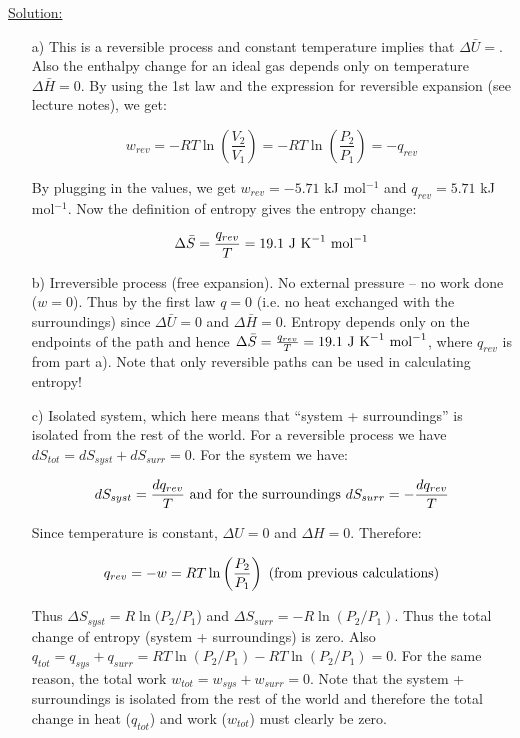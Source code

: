 \noindent
\underline{Solution:}\\

\begin{itemize}

\item[a)] This is a reversible process and constant temperature implies that $\Delta\bar{U} = $. Also the enthalpy change for an ideal gas depends only on temperature $\Delta\bar{H} = 0$. By using the 1st law and the expression for reversible expansion (see lecture notes), we get:

$$w_{rev} = -RT\ln\left(\frac{V_2}{V_1}\right) = -RT\ln\left(\frac{P_2}{P_1}\right) = - q_{rev}$$

By plugging in the values, we get $w_{rev} = -5.71$ kJ mol$^{-1}$ and $q_{rev} = 5.71$ kJ mol$^{-1}$. Now the definition of entropy gives the entropy change:

$$\Delta\bar{S} = \frac{q_{rev}}{T} = 19.1\textnormal{ J K}^{-1}\textnormal{ mol}^{-1}$$

\item[b)] Irreversible process (free expansion). No external pressure -- no work done ($w = 0$). Thus by the first law $q = 0$ (i.e. no heat exchanged with the surroundings) since $\Delta\bar{U} = 0$ and $\Delta\bar{H} = 0$. Entropy depends only on the endpoints of the path and hence $\Delta\bar{S} = \frac{q_{rev}}{T} = 19.1\textnormal{ J K}^{-1}\textnormal{ mol}^{-1}$, where $q_{rev}$ is from part a). Note that only reversible paths can be used in calculating entropy!

\item[c)] Isolated system, which here means that ``system + surroundings'' is isolated from the rest of the world. For a reversible process we have $dS_{tot} = dS_{syst} + dS_{surr} = 0$. For the system we have:

$$dS_{syst} = \frac{dq_{rev}}{T}\textnormal{ and for the surroundings }dS_{surr} = -\frac{dq_{rev}}{T}$$

Since temperature is constant, $\Delta U = 0$ and $\Delta H = 0$. Therefore:

$$q_{rev} = -w = RT\ln\left(\frac{P_2}{P_1}\right)\textnormal{ (from previous calculations)}$$

Thus $\Delta S_{syst} = R\ln(P_2/P_1$) and $\Delta S_{surr}  = -R\ln(P_2/P_1)$. Thus the total change of entropy (system + surroundings) is zero. Also $q_{tot} = q_{sys} + q_{surr} = RT\ln(P_2/P_1) - RT\ln(P_2/P_1) = 0$. For the same reason, the total work $w_{tot} = w_{sys} + w_{surr} = 0$. Note that the system + surroundings is isolated from the rest of the world and therefore the total change in heat ($q_{tot}$) and work ($w_{tot}$) must clearly be zero.


\end{itemize}
